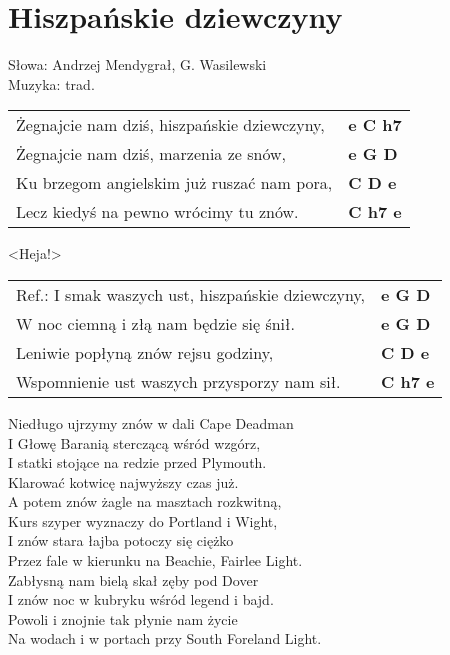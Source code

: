 \section{Hiszpańskie dziewczyny}

Słowa: Andrzej Mendygrał, G. Wasilewski\\
Muzyka:  trad.

\vspace{2em}
\begin{tabular}{@{}p{9cm}@{}l@{}}
Żegnajcie nam dziś, hiszpańskie dziewczyny, & \bfseries  e C h7 \\
Żegnajcie nam dziś, marzenia ze snów,  & \bfseries  e G D \\
Ku brzegom angielskim już ruszać nam pora, & \bfseries  C D e \\
Lecz kiedyś na pewno wrócimy tu znów. & \bfseries C h7 e \\
\end{tabular}

\vspace{1em}
<Heja!>

\begin{tabular}{@{}p{9cm}@{}l@{}}
Ref.: I smak waszych ust, hiszpańskie dziewczyny, & \bfseries  e G D \\
W noc ciemną i złą nam będzie się śnił. & \bfseries  e G D \\
Leniwie popłyną znów rejsu godziny, & \bfseries  C D e \\
Wspomnienie ust waszych przysporzy nam sił. & \bfseries  C h7 e \\
\end{tabular}

\vspace{1em}
Niedługo ujrzymy znów w dali Cape Deadman \\
I Głowę Baranią sterczącą wśród wzgórz, \\
I statki stojące na redzie przed Plymouth. \\
Klarować kotwicę najwyższy czas już. \\

A potem znów żagle na masztach rozkwitną, \\
Kurs szyper wyznaczy do Portland i Wight, \\
I znów stara łajba potoczy się ciężko \\
Przez fale w kierunku na Beachie, Fairlee Light. \\

Zabłysną nam bielą skał zęby pod Dover \\
I znów noc w kubryku wśród legend i bajd. \\
Powoli i znojnie tak płynie nam życie \\
Na wodach i w portach przy South Foreland Light. \\